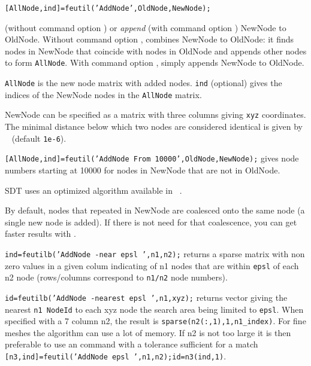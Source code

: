 
{\tt [AllNode,ind]=feutil('AddNode',{\ti OldNode},{\ti NewNode});}

 (without command option ) or {\sl append} (with command option ) {\ti NewNode} to {\ti OldNode}. 
Without command option ,  combines {\ti NewNode} to {\ti OldNode}: it finds nodes in {\ti NewNode} that coincide with nodes in {\ti OldNode} and appends other nodes to form {\tt AllNode}. 
With command option ,  simply appends {\ti NewNode} to {\ti OldNode}.

{\tt AllNode} is the new node matrix with added nodes.
{\tt ind} (optional) gives the indices of the {\ti NewNode} nodes in the {\tt AllNode} matrix.

{\ti NewNode} can be specified as a matrix with three columns giving {\tt xyz} coordinates. The minimal distance below which two nodes are considered identical is given by \sdtdef\  (default {\tt 1e-6}).

{\tt [AllNode,ind]=feutil('AddNode From 10000',{\ti OldNode},{\ti NewNode});} gives node numbers starting at 10000 for nodes in {\ti NewNode} that are not in {\ti OldNode}.

\begin{SDT}
SDT uses an optimized algorithm available in \feutilb\ . 

By default, nodes that repeated in {\ti NewNode} are coalesced onto the same node (a single new node is added). If there is not need for that coalescence, you can get faster results with .  

{\tt ind=feutilb('AddNode -near epsl ',{\ti n1},{\ti n2});} returns a sparse matrix with non zero values in a given colum indicating of {\ti n1} nodes that are within {\tt epsl} of each {\ti n2} node (rows/columns correspond to {\tt n1/n2} node numbers). 

{\tt id=feutilb('AddNode -nearest epsl ',{\ti n1},{\ti xyz});} returns vector giving the nearest {\tt {\ti n1} NodeId}  to each {\ti xyz} node the search area being limited to {\tt epsl}. When specified with a 7 column {\ti n2}, the result is {\tt sparse(n2(:,1),1,n1\_index)}. For fine meshes the algorithm can use a lot of memory. If {\ti n2} is not too large it is then preferable to use an  command with a tolerance sufficient for a match {\tt [n3,ind]=feutil('AddNode epsl ',{\ti n1},{\ti n2});id=n3(ind,1)}.
\end{SDT}

